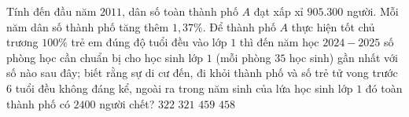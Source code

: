 \begin{ex}%
Tính đến đầu năm $2011$, dân số toàn thành phố $A$ đạt xấp xỉ $905.300$ người. Mỗi năm dân số thành phố tăng thêm $1{,}37\%$. Để thành phố $A$ thực hiện tốt chủ trương $100\%$ trẻ em đúng độ tuổi đều vào lớp $1$ thì đến năm học $2024-2025$ số phòng học cần chuẩn bị cho học sinh lớp $1$ (mỗi phòng $35$ học sinh) gần nhất với số nào sau đây; biết rằng sự di cư đến, đi khỏi thành phố và số trẻ tử vong trước $6$ tuổi đều không đáng kể, ngoài ra trong năm sinh của lứa học sinh lớp $1$ đó toàn thành phố có $2400$ người chết?
	\choice
	{$322$}
	{$321$}
	{$459$}
	{\True $458$}
\end{ex}

